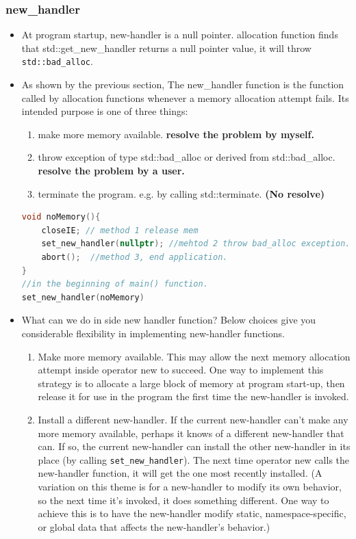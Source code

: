 \documentclass[a4paper,12pt,twoside]{book}
\begin{document}
\subsubsection{new\_handler}
\begin{itemize}
	\item At program startup, new-handler is a null pointer. allocation function finds that std::get\_new\_handler returns a null pointer value, it will throw \texttt{std::bad\_alloc}.
	
	\item  As shown by the previous section, The new\_handler function is the function called by allocation functions whenever a memory allocation attempt fails. Its intended purpose is one of three things:
	
	
	\begin{enumerate}
		\item make more memory available. \textbf{resolve the problem by myself.}
		
		\item throw exception of type std::bad\_alloc or derived from std::bad\_alloc. \textbf{resolve the problem by a user.}
		
		\item terminate the program. e.g. by calling std::terminate. \textbf{(No resolve)}
	\end{enumerate}
	
\begin{lstlisting}[frame=single, language=c++]
void noMemory(){
	closeIE; // method 1 release mem
	set_new_handler(nullptr); //mehtod 2 throw bad_alloc exception.
	abort();  //method 3, end application.
}
//in the beginning of main() function.
set_new_handler(noMemory)
\end{lstlisting}
	
	
	\item What can we do in side new handler function? Below choices give you considerable flexibility in implementing new-handler functions.
	\begin{enumerate}
		
		\item Make more memory available. This may allow the next memory allocation attempt inside operator new to succeed. One way to implement this strategy is to allocate a large block of memory at program start-up, then release it for use in the program the first time the new-handler is invoked.
		
		\item Install a different new-handler. If the current new-handler can't make any more memory available, perhaps it knows of a different new-handler that can. If so, the current new-handler can install the other new-handler in its place (by calling \texttt{set\_new\_handler}). The next time operator new calls the new-handler function, it will get the one most recently installed. (A variation on this theme is for a new-handler to modify its own behavior, so the next time it's invoked, it does something different. One way to achieve this is to have the new-handler modify static, namespace-specific, or global data that affects the new-handler's behavior.)
		

\end{enumerate}
\end{itemize}
\end{document}
